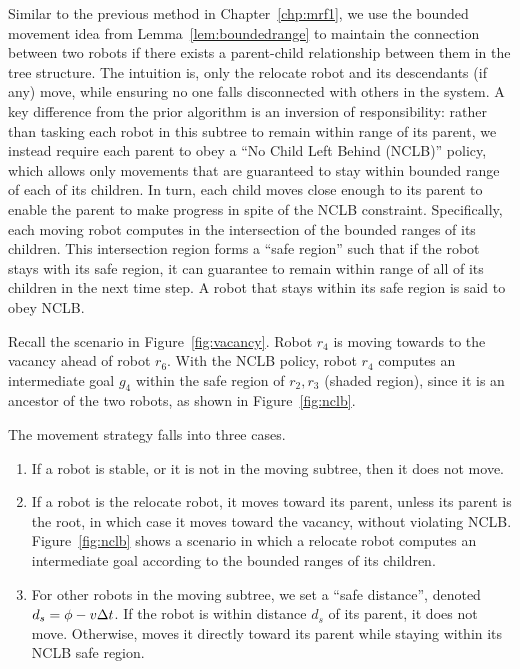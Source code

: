Similar to the previous method in Chapter~\ref{chp:mrf1}, we use the bounded movement idea from Lemma~\ref{lem:boundedrange} to maintain
the connection between two robots if there exists a parent-child relationship
between them in the tree structure.  
%
The intuition is, only the relocate robot and its descendants (if any) move, while ensuring no one falls disconnected with others in the system.
%
A key difference from the prior algorithm is an inversion of responsibility:
rather than tasking each robot in this subtree to remain within range of its
parent, we instead require each parent to obey a ``No Child Left Behind
(NCLB)'' policy, which allows only movements that are guaranteed to stay within
bounded range of each of its children.
%
In turn, each child moves close enough to its parent to enable the parent to
make progress in spite of the NCLB constraint.
%
Specifically, each moving robot computes in the intersection of the bounded
ranges of its children.  
%
This intersection region forms a ``safe region'' such
that if the robot stays with its safe region, it can guarantee to remain within
range of all of its children in the next time step.  
%
A robot that stays within
its safe region is said to obey NCLB.


Recall the scenario in Figure~\ref{fig:vacancy}.
Robot $r_4$ is moving towards to the vacancy ahead of robot $r_6$. 
%
With the NCLB policy, robot $r_4$ computes an intermediate goal $g_4$ within the safe region of $r_2, r_3$ (shaded region), since it is an ancestor of the two robots, as shown in Figure~\ref{fig:nclb}.

The movement strategy falls into three cases.
\begin{enumerate}
  \item If a robot is stable, or it is not in the moving subtree, then it does
  not move.

  \item If a robot is the relocate robot, it moves
  toward its parent, unless its parent is the root, in which case it moves
  toward the vacancy, without violating NCLB.
  Figure~\ref{fig:nclb} shows a scenario in which a relocate robot
  computes an intermediate goal according to the bounded ranges of its
  children.

  \item For other robots in the moving subtree, we set a ``safe distance'',
  denoted $d_s = \phi-v\Delta t$.  If the robot is within distance $d_s$ of
  its parent, it does not move.  Otherwise, moves it directly toward its parent
  while staying within its NCLB safe region.
\end{enumerate}

